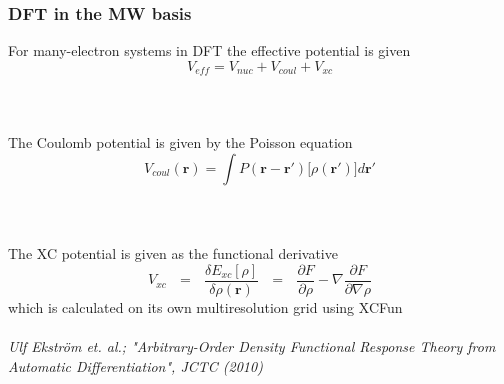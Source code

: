\documentclass[slides]{beamer}
\begin{document}
%

\begin{frame}
    \frametitle{DFT in the MW basis}
    For many-electron systems in DFT the effective potential is given
    \begin{equation}
	\nonumber
	V_{eff} = V_{nuc} + V_{coul} + V_{xc}
    \end{equation}
    \ \\
    \ \\
    \ \\
    \pause
    The Coulomb potential is given by the Poisson equation 
    \begin{equation}
	\nonumber
	V_{coul}(\boldsymbol{r}) = 
	\int
	P(\boldsymbol{r} - \boldsymbol{r}') \Big[ \rho(\boldsymbol{r}')\Big] d\boldsymbol{r}'
    \end{equation}
    \ \\
    \ \\
    \ \\
    \pause
    The XC potential is given as the functional derivative
    \begin{equation}
	\nonumber
	V_{xc} \ \ \ = \ \ \ \frac{\delta E_{xc}[\rho]}{\delta \rho(\boldsymbol{r})}
	       \ \ \ = \ \ \ \frac{\partial F}{\partial \rho} - 
		    \nabla \frac{\partial F}{\partial \nabla \rho}
    \end{equation}
    which is calculated on its own multiresolution grid using XCFun\\
    \ \\
    \tiny
    \it{Ulf Ekstr\"{o}m et. al.; "Arbitrary-Order Density Functional Response Theory from 
	Automatic Differentiation", JCTC (2010)}
\end{frame}
\end{document}

